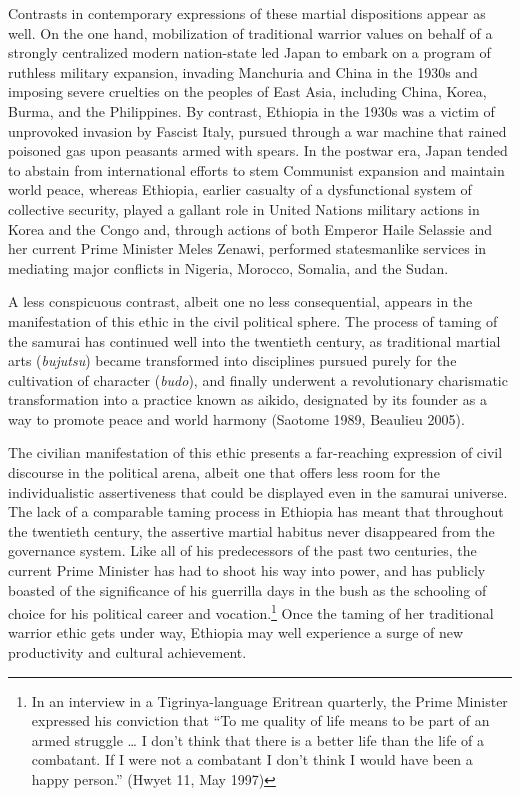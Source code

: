 Contrasts in contemporary expressions of these martial dispositions appear as well. On the one hand, mobilization of traditional warrior values on behalf of a strongly centralized modern nation-state led Japan to embark on a program of ruthless military expansion, invading Manchuria and China in the 1930s and imposing severe cruelties on the peoples of East Asia, including China, Korea, Burma, and the Philippines.  By contrast, Ethiopia in the 1930s was a victim of unprovoked invasion by Fascist Italy, pursued through a war machine that rained poisoned gas upon peasants armed with spears. In the postwar era, Japan tended to abstain from international efforts to stem Communist expansion and maintain world peace, whereas Ethiopia, earlier casualty of a dysfunctional system of collective security, played a gallant role in United Nations military actions in Korea and the Congo and, through actions of both Emperor Haile Selassie and her current Prime Minister Meles Zenawi, performed statesmanlike services in mediating major conflicts in Nigeria, Morocco, Somalia, and the Sudan.

A less conspicuous contrast, albeit one no less consequential, appears in the manifestation of this ethic in the civil political sphere. The process of taming of the samurai has continued well into the twentieth century, as traditional martial arts (\emph{bujutsu}) became transformed into disciplines pursued purely for the cultivation of character (\emph{budo}), and finally underwent a revolutionary charismatic transformation into a practice known as aikido, designated by its founder as a way to promote peace and world harmony (Saotome 1989, Beaulieu 2005).

The civilian manifestation of this ethic presents a far-reaching expression of civil discourse in the political arena, albeit one that offers less room for the individualistic assertiveness that could be displayed even in the samurai universe.  The lack of a comparable taming process in Ethiopia has meant that throughout the twentieth century, the assertive martial habitus never disappeared from the governance system. Like all of his predecessors of the past two centuries, the current Prime Minister has had to shoot his way into power, and has publicly boasted of the significance of his guerrilla days in the bush as the schooling of choice for his political career and vocation.\footnote{In an interview in a Tigrinya-language Eritrean quarterly, the Prime Minister expressed his conviction that ``To me quality of life means to be part of an armed struggle \ldots{} I don't think that there is a better life than the life of a combatant.  If I were not a combatant I don’t think I would have been a happy person.'' (Hwyet 11, May 1997)} Once the taming of her traditional warrior ethic gets under way, Ethiopia may well experience a surge of new productivity and cultural achievement. 

